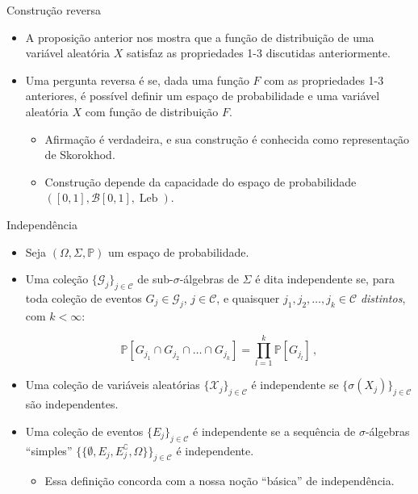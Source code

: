 \documentclass[11pt]{beamer}
\begin{document}
\begin{frame}{Construção reversa}
\begin{itemize}
	\item A proposição anterior nos mostra que a função de distribuição de uma variável aleatória $X$ satisfaz as propriedades 1-3 discutidas anteriormente.
	\item Uma pergunta reversa é se, dada uma função $F$ com as propriedades 1-3 anteriores, é possível definir um espaço de probabilidade e uma variável aleatória $X$ com função de distribuição $F$.
	\begin{itemize}
		\item Afirmação é verdadeira, e sua construção é conhecida como {\color{blue}representação de Skorokhod}.
		\item Construção depende da capacidade do espaço de probabilidade $([0,1],\mathcal{B}[0,1], \operatorname{Leb})$.
	\end{itemize}
\end{itemize}
\end{frame}
\begin{frame}{Independência}
	\begin{itemize}
		\item Seja $(\Omega, \Sigma,\mathbb{P})$ um espaço de probabilidade.
		\item Uma coleção $\{\mathcal{G}_j\}_{j \in \mathcal{C}}$ de sub-$\sigma$-álgebras de $\Sigma$ é dita independente se, para toda coleção de eventos $G_j \in \mathcal{G}_j$, $j \in \mathcal{C}$, e quaisquer $j_1, j_2, \ldots, j_k \in \mathcal{C}$ \emph{distintos}, com $k < \infty$:
		
		$$\mathbb{P}[G_{j_1}\cap G_{j_2}\cap \ldots \cap G_{j_k}] = \prod_{l=1}^k \mathbb{P}[G_{j_l}]\, ,$$
		\item Uma coleção de variáveis aleatórias $\{\mathcal{X}_j \}_{j \in \mathcal{C}}$ é independente se $\{\sigma(X_j)\}_{j \in \mathcal{C}}$ são independentes.
		\item Uma coleção de eventos $\{E_j\}_{j\in \mathcal{C}}$ é independente se a sequência de $\sigma$-álgebras ``simples''   $\{\{\emptyset, E_j, E_j^{\complement},\Omega\}\}_{j\in \mathcal{C}}$ é independente.
		\begin{itemize}
			\item Essa definição concorda com a nossa noção ``básica'' de independência.
		\end{itemize}
	\end{itemize}
\end{frame}
\end{document}
